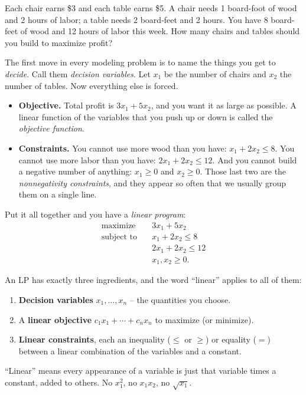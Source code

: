 Each chair earns \$3 and each table earns \$5. A chair needs 1 board-foot of
wood and 2 hours of labor; a table needs 2 board-feet and 2 hours. You have 8
board-feet of wood and 12 hours of labor this week. How many chairs and tables
should you build to maximize profit?

The first move in every modeling problem is to name the things you get to
\emph{decide}. Call them \emph{decision variables}. Let $x_1$ be the number of
chairs and $x_2$ the number of tables. Now everything else is forced.

\begin{itemize}
\item \textbf{Objective.} Total profit is $3x_1 + 5x_2$, and you want it as
  large as possible. A linear function of the variables that you push up or
  down is called the \emph{objective function}.
\item \textbf{Constraints.} You cannot use more wood than you have:
  $x_1 + 2x_2 \le 8$. You cannot use more labor than you have:
  $2x_1 + 2x_2 \le 12$. And you cannot build a negative number of anything:
  $x_1 \ge 0$ and $x_2 \ge 0$. Those last two are the \emph{nonnegativity
  constraints}, and they appear so often that we usually group them on a single
  line.
\end{itemize}

Put it all together and you have a \emph{linear program}:
\[
\begin{aligned}
\text{maximize}\quad   & 3x_1 + 5x_2 \\
\text{subject to}\quad & x_1 + 2x_2 \le 8 \\
                       & 2x_1 + 2x_2 \le 12 \\
                       & x_1, x_2 \ge 0.
\end{aligned}
\]

\begin{focusbox}
An LP has exactly three ingredients, and the word ``linear'' applies to all of
them:
\begin{enumerate}
\item \textbf{Decision variables} $x_1,\dots,x_n$ -- the quantities you choose.
\item A \textbf{linear objective} $c_1 x_1 + \cdots + c_n x_n$ to maximize (or
  minimize).
\item \textbf{Linear constraints}, each an inequality ($\le$ or $\ge$) or
  equality ($=$) between a linear combination of the variables and a constant.
\end{enumerate}
``Linear'' means every appearance of a variable is just that variable times a
constant, added to others. No $x_1^2$, no $x_1 x_2$, no $\sqrt{x_1}$.
\end{focusbox}

